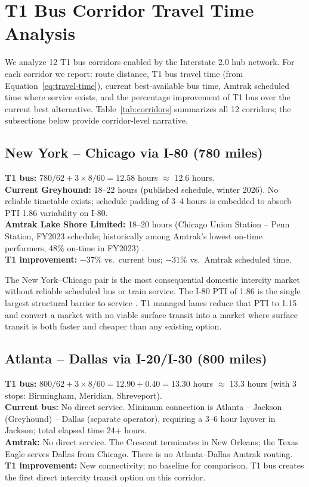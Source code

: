 \section{T1 Bus Corridor Travel Time Analysis}
\label{sec:travel-time}

We analyze 12 T1 bus corridors enabled by the Interstate 2.0 hub network. For each corridor we report: route distance, T1 bus travel time (from Equation~\ref{eq:travel-time}), current best-available bus time, Amtrak scheduled time where service exists, and the percentage improvement of T1 bus over the current best alternative. Table~\ref{tab:corridors} summarizes all 12 corridors; the subsections below provide corridor-level narrative.

\subsection{New York -- Chicago via I-80 (780 miles)}

\textbf{T1 bus:} $780 / 62 + 3 \times 8/60 = 12.58$ hours $\approx$ 12.6 hours. \\
\textbf{Current Greyhound:} 18--22 hours (published schedule, winter 2026). No reliable timetable exists; schedule padding of 3--4 hours is embedded to absorb PTI 1.86 variability on I-80. \\
\textbf{Amtrak Lake Shore Limited:} 18--20 hours (Chicago Union Station -- Penn Station, FY2023 schedule; historically among Amtrak's lowest on-time performers, 48\% on-time in FY2023) \citep{Amtrak2023}. \\
\textbf{T1 improvement:} $-37\%$ vs.\ current bus; $-31\%$ vs.\ Amtrak scheduled time.

The New York--Chicago pair is the most consequential domestic intercity market without reliable scheduled bus or train service. The I-80 PTI of 1.86 is the single largest structural barrier to service \citep{FHWA_freight2023}. T1 managed lanes reduce that PTI to 1.15 and convert a market with no viable surface transit into a market where surface transit is both faster and cheaper than any existing option.

\subsection{Atlanta -- Dallas via I-20/I-30 (800 miles)}

\textbf{T1 bus:} $800 / 62 + 3 \times 8/60 = 12.90 + 0.40 = 13.30$ hours $\approx$ 13.3 hours (with 3 stops: Birmingham, Meridian, Shreveport). \\
\textbf{Current bus:} No direct service. Minimum connection is Atlanta -- Jackson (Greyhound) -- Dallas (separate operator), requiring a 3--6 hour layover in Jackson; total elapsed time 24+ hours. \\
\textbf{Amtrak:} No direct service. The Crescent terminates in New Orleans; the Texas Eagle serves Dallas from Chicago. There is no Atlanta--Dallas Amtrak routing. \\
\textbf{T1 improvement:} New connectivity; no baseline for comparison. T1 bus creates the first direct intercity transit option on this corridor.

